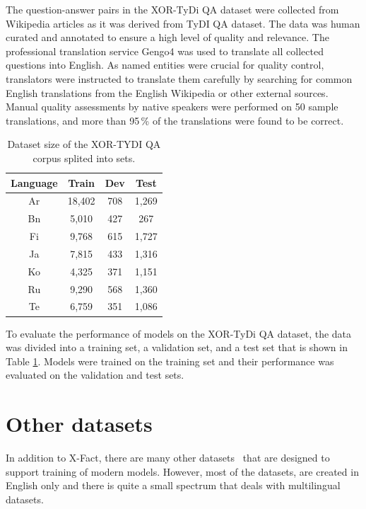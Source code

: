 The question-answer pairs in the XOR-TyDi QA dataset were collected from Wikipedia articles as it was derived from TyDI QA dataset. The data was human curated and annotated to ensure a high level of quality and relevance. The professional translation service Gengo4 was used to translate all collected questions into English. As named entities were crucial for quality control, translators were instructed to translate them carefully by searching for common English translations from the English Wikipedia or other external sources. Manual quality assessments by native speakers were performed on 50 sample translations, and more than 95\,\% of the translations were found to be correct.

\begin{table}[ht]
    \centering
    \begin{tabular}{c|ccc}
        Language & Train & Dev & Test \\
        \hline
        \hline
        Ar & 18,402 & 708 & 1,269 \\
        Bn & 5,010 & 427 & 267 \\
        Fi & 9,768 & 615 & 1,727 \\
        Ja & 7,815 & 433 & 1,316 \\
        Ko & 4,325 & 371 & 1,151 \\
        Ru & 9,290 & 568 & 1,360 \\
        Te & 6,759 & 351 & 1,086
    \end{tabular}
    \caption{Dataset size of the XOR-TYDI QA corpus splited into sets.}
    \label{tab:stats}
\end{table}

To evaluate the performance of models on the XOR-TyDi QA dataset, the data was divided into a training set, a validation set, and a test set that is shown in Table \ref{tab:stats}. Models were trained on the training set and their performance was evaluated on the validation and test sets.


\section{Other datasets}
In addition to X-Fact, there are many other datasets~\cite{fever}\cite{politifact}\cite{covert}\cite{fakenewsnet}\cite{liar} that are designed to support training of modern models. However, most of the datasets, are created in English only and there is quite a small spectrum that deals with multilingual datasets.

